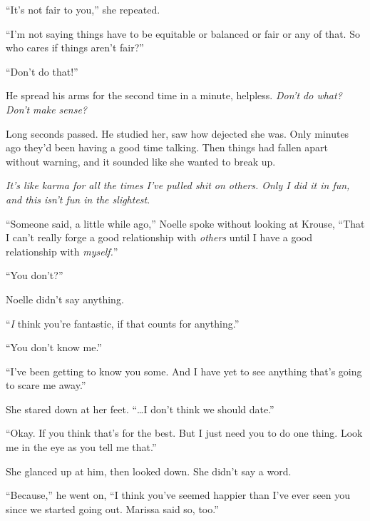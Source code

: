 ``It's not fair to you,'' she repeated.



``I'm not saying things have to be equitable or balanced or fair or any of that.  So who cares if things aren't fair?''



``Don't do that!''



He spread his arms for the second time in a minute, helpless.  \emph{Don't do what?}\emph{Don't make sense?}



Long seconds passed.  He studied her, saw how dejected she was.  Only minutes ago they'd been having a good time talking.  Then things had fallen apart without warning, and it sounded like she wanted to break up.



\emph{It's like karma for all the times I've pulled shit on others.  Only I did it in fun, and this isn't fun in the slightest}.



``Someone said, a little while ago,'' Noelle spoke without looking at Krouse, ``That I can't really forge a good relationship with \emph{others} until I have a good relationship with \emph{myself.}''



``You don't?''



Noelle didn't say anything.



``\emph{I} think you're fantastic, if that counts for anything.''



``You don't know me.''



``I've been getting to know you some.  And I have yet to see anything that's going to scare me away.''



She stared down at her feet.  ``\ldots{}I don't think we should date.''



``Okay.  If you think that's for the best.  But I just need you to do one thing.  Look me in the eye as you tell me that.''



She glanced up at him, then looked down.  She didn't say a word.



``Because,'' he went on, ``I think you've seemed happier than I've ever seen you since we started going out.  Marissa said so, too.''



